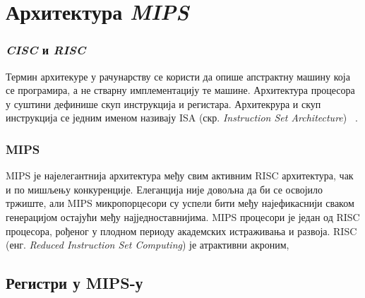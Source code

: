 \documentclass[12pt,oneside]{memoir}
\begin{document}



\chapter{Архитектура \textit{MIPS}}
\label{chp:mips}
\subsection{\textit{CISC} и \textit{RISC}}

\indent Термин архитекуре у рачунарству се користи да опише апстрактну машину која се програмира, а не стварну имплементацију те машине. Архитектура процесора у суштини дефинише скуп инструкција и регистара. Архитекрура и скуп инструкција се једним именом називају ISA (скр. \textit{Instruction Set Architecture}) ~\cite{SeeMIPSRun}.

\subsection{MIPS}
\indent MIPS је најелегантнија архитектура међу свим активним RISC архитектура, чак и по мишљењу конкуренције. Елеганција није довољна да би се освојило тржиште, али MIPS микропорцесори су успели бити међу најефикаснији сваком генерацијом остајући међу најједноставнијима.
MIPS процесори је један од RISC процесора, рођеног у плодном периоду академских истраживања и развоја. RISC  (енг. \textit{Reduced Instruction Set Computing}) је атрактивни акроним, 
~\cite{SeeMIPSRun}

\section{Регистри у MIPS-у}
\end{document}
